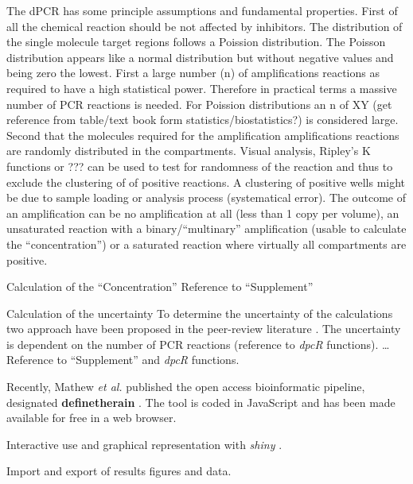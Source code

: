 \documentclass[a4,center,fleqn]{NAR}
\begin{document}
The dPCR has some principle assumptions and fundamental properties. First of all 
the chemical reaction should be not affected by inhibitors. The distribution of 
the single molecule target regions follows a Poission distribution. The Poisson 
distribution appears like a normal distribution but without negative values and 
being zero the lowest. First a large number (n) of amplifications reactions as 
required to have a high statistical power. Therefore in practical terms a 
massive number of PCR reactions is needed. For Poission distributions an n of XY 
(get reference from table/text book form statistics/biostatistics?) is 
considered large. Second that the molecules required for the amplification 
amplifications reactions are randomly distributed in the compartments. Visual 
analysis, Ripley's K functions or ??? can be used to test for randomness of the 
reaction and thus to exclude the clustering of of positive reactions. A 
clustering of positive wells might be due to sample loading or analysis process 
(systematical error). The outcome of an amplification can be no amplification at 
all (less than 1 copy per volume), an unsaturated reaction with a 
binary/``multinary'' amplification (usable to calculate the ``concentration'') 
or a saturated reaction where virtually all compartments are positive.

Calculation of the ``Concentration''
Reference to ``Supplement''

Calculation of the uncertainty
To determine the uncertainty of the calculations two approach have been proposed 
in the peer-review literature \cite{dube_mathematical_2008, bhat_single_2009}. The uncertainty is 
dependent on the number of PCR reactions (reference to \textit{\textit{dpcR}} 
functions). … Reference to ``Supplement'' and \textit{dpcR} functions.

Recently, Mathew \textit{et al.} published the open access bioinformatic 
pipeline, designated \textbf{definetherain} \cite{jones_low_2014}. The tool is 
coded in JavaScript and has been made available for free in a web browser.

Interactive use and graphical representation with \textit{shiny} \cite{shiny}.

Import and export of results figures and data.
\end{document}
